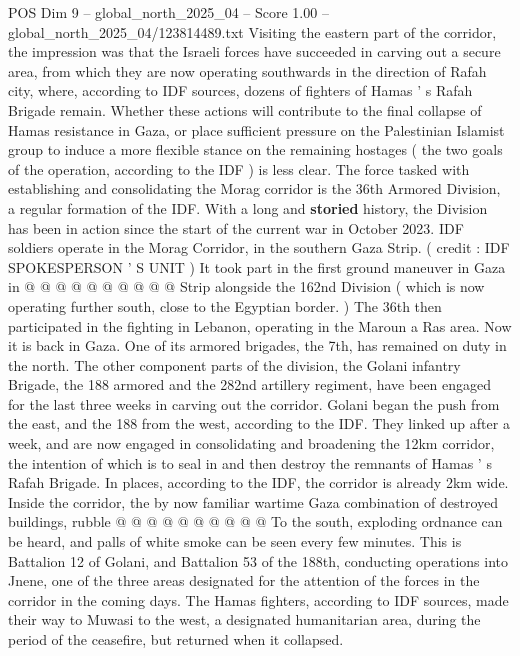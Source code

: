 \begin{textsample}{POS Dim 9 – global\_north\_2025\_04 – Score 1.00 – global\_north\_2025\_04/123814489.txt}  \label{ex:f9_pos_429}
Visiting the eastern part of the corridor, the impression was that the Israeli forces have succeeded in carving out a secure area, from which they are now operating southwards in the direction of Rafah city, where, according to IDF sources, dozens of fighters of Hamas ' s Rafah Brigade remain.
Whether these actions will contribute to the final collapse of Hamas resistance in Gaza, or place sufficient pressure on the Palestinian Islamist group to induce a more flexible stance on the remaining hostages ( the two goals of the operation, according to the IDF ) is less clear.
The force tasked with establishing and consolidating the Morag corridor is the 36th Armored Division, a regular formation of the IDF.
With a long and \textbf{storied} history, the Division has been in action since the start of the current war in October 2023.
IDF soldiers operate in the Morag Corridor, in the southern Gaza Strip. ( credit : IDF SPOKESPERSON ' S UNIT ) It took part in the first ground maneuver in Gaza in @ @ @ @ @ @ @ @ @ @ Strip alongside the 162nd Division ( which is now operating further south, close to the Egyptian border. ) The 36th then participated in the fighting in Lebanon, operating in the Maroun a Ras area.
Now it is back in Gaza.
One of its armored brigades, the 7th, has remained on duty in the north.
The other component parts of the division, the Golani infantry Brigade, the 188 armored and the 282nd artillery regiment, have been engaged for the last three weeks in carving out the corridor.
Golani began the push from the east, and the 188 from the west, according to the IDF.
They linked up after a week, and are now engaged in consolidating and broadening the 12km corridor, the intention of which is to seal in and then destroy the remnants of Hamas ' s Rafah Brigade.
In places, according to the IDF, the corridor is already 2km wide.
Inside the corridor, the by now familiar wartime Gaza combination of destroyed buildings, rubble @ @ @ @ @ @ @ @ @ @ To the south, exploding ordnance can be heard, and palls of white smoke can be seen every few minutes.
This is Battalion 12 of Golani, and Battalion 53 of the 188th, conducting operations into Jnene, one of the three areas designated for the attention of the forces in the corridor in the coming days.
The Hamas fighters, according to IDF sources, made their way to Muwasi to the west, a designated humanitarian area, during the period of the ceasefire, but returned when it collapsed.

\end{textsample}
